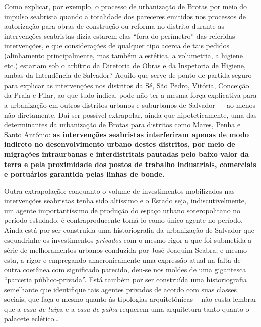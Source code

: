 Como explicar, por exemplo, o processo de urbanização de Brotas por meio do impulso seabrista quando a totalidade dos pareceres emitidos nos processos de autorização para obras de construção ou reforma no distrito durante as intervenções seabristas dizia estarem elas ``fora do perímetro'' das referidas intervenções, e que considerações de qualquer tipo acerca de tais pedidos (alinhamento principalmente, mas também a estética, a volumetria, a higiene etc.) estariam sob o arbítrio da Diretoria de Obras e da Inspetoria de Higiene, ambas da Intendência de Salvador? Aquilo que serve de ponto de partida seguro para explicar as intervenções nos distritos da Sé, São Pedro, Vitória, Conceição da Praia e Pilar, ao que tudo indica, pode não ter a mesma força explicativa para a urbanização em outros distritos urbanos e suburbanos de Salvador --- ao menos não diretamente. Daí ser possível extrapolar, ainda que hipoteticamente, uma das determinantes da urbanização de Brotas para distritos como Mares, Penha e Santo Antônio: \textbf{as intervenções seabristas interferiram apenas de modo indireto no desenvolvimento urbano destes distritos, por meio de migrações intraurbanas e interdistritais pautadas pelo baixo valor da terra e pela proximidade dos postos de trabalho industriais, comerciais e portuários garantida pelas linhas de bonde.}

Outra extrapolação: conquanto o volume de investimentos mobilizados nas intervenções seabristas tenha sido altíssimo e o Estado seja, indiscutivelmente, um agente importantíssimo de produção do espaço urbano soteropolitano no período estudado, é contraproducente tomá-lo como único agente no período. Ainda está por ser construída uma historiografia da urbanização de Salvador que esquadrinhe os investimentos \textit{privados} com o mesmo rigor a que foi submetida a série de melhoramentos urbanos conduzida por José Joaquim Seabra, e mesmo esta, a rigor e empregando anacronicamente uma expressão atual na falta de outra coetânea com significado parecido, deu-se nos moldes de uma gigantesca ``parceria público-privada''. Está também por ser construída uma historiografia semelhante que identifique tais agentes privados de acordo com suas classes sociais, que faça o mesmo quanto às tipologias arquitetônicas – não custa lembrar que a \textit{casa de taip}a e a \textit{casa de palha} requerem uma arquitetura tanto quanto o palacete eclético\dots

